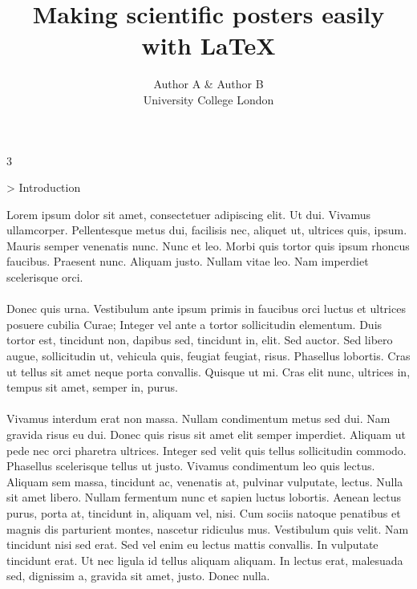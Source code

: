 \documentclass[a0,final]{a0poster}
\title{Making scientific posters easily with \LaTeX}
\author{Author A \& Author B\\
University College London}
\newenvironment{Section}[1]				%
{
\par 
\flushleft
\colorbox{boxcol}{%
\sffamily\large\color{headingcol}> \color{white} #1%
\hspace{0.5cm}}
\par\nobreak 
\nointerlineskip 						%
\setlength\parskip{-1pt}					%
\begin{lrbox}\envbox						%
\begin{minipage}{0.95\columnwidth}		%
}
{\par
\end{minipage}\end{lrbox}				%
\fcolorbox{boxcol}{fillcol}{\usebox\envbox}	%
\vspace{1cm}							%
}
\begin{document}
\hspace{-3cm}								%
\colorbox{boxcol}{							%
\begin{minipage}{1189mm}					%
\maketitle
\end{minipage}}
\vspace{1cm}

\begin{multicols}{3}							%
\raggedcolumns							%

\begin{Section}{Introduction}
Lorem ipsum dolor sit amet, consectetuer adipiscing elit. Ut dui. Vivamus ullamcorper. Pellentesque metus dui, facilisis nec, aliquet ut, ultrices quis, ipsum. Mauris semper venenatis nunc. Nunc et leo. Morbi quis tortor quis ipsum rhoncus faucibus. Praesent nunc. Aliquam justo. Nullam vitae leo. Nam imperdiet scelerisque orci.\\
\\
Donec quis urna. Vestibulum ante ipsum primis in faucibus orci luctus et ultrices posuere cubilia Curae; Integer vel ante a tortor sollicitudin elementum. Duis tortor est, tincidunt non, dapibus sed, tincidunt in, elit. Sed auctor. Sed libero augue, sollicitudin ut, vehicula quis, feugiat feugiat, risus. Phasellus lobortis. Cras ut tellus sit amet neque porta convallis. Quisque ut mi. Cras elit nunc, ultrices in, tempus sit amet, semper in, purus.\\
\\
Vivamus interdum erat non massa. Nullam condimentum metus sed dui. Nam gravida risus eu dui. Donec quis risus sit amet elit semper imperdiet. Aliquam ut pede nec orci pharetra ultrices. Integer sed velit quis tellus sollicitudin commodo. Phasellus scelerisque tellus ut justo. Vivamus condimentum leo quis lectus. Aliquam sem massa, tincidunt ac, venenatis at, pulvinar vulputate, lectus. Nulla sit amet libero. Nullam fermentum nunc et sapien luctus lobortis. Aenean lectus purus, porta at, tincidunt in, aliquam vel, nisi. Cum sociis natoque penatibus et magnis dis parturient montes, nascetur ridiculus mus. Vestibulum quis velit. Nam tincidunt nisi sed erat. Sed vel enim eu lectus mattis convallis. In vulputate tincidunt erat. Ut nec ligula id tellus aliquam aliquam. In lectus erat, malesuada sed, dignissim a, gravida sit amet, justo. Donec nulla.
\end{Section}


\end{multicols}
\end{document}
